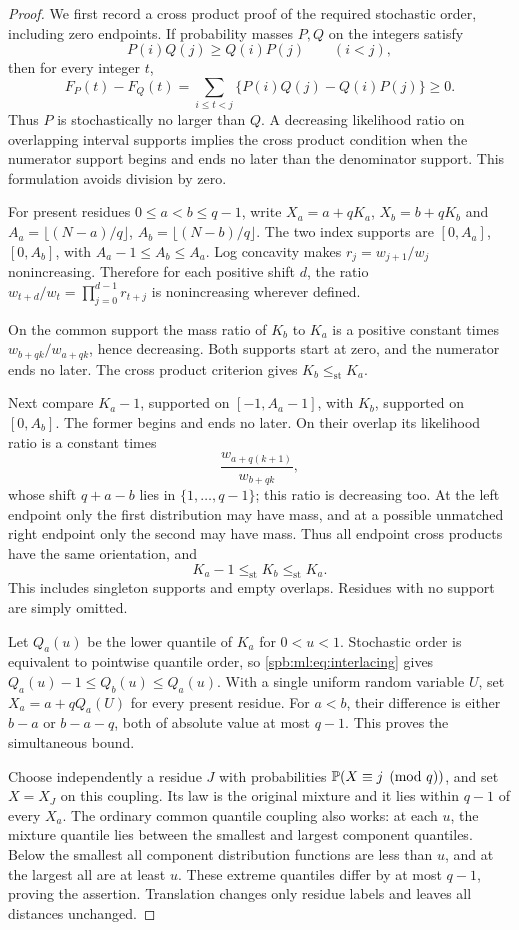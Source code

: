 \begin{proof}
We first record a cross product proof of the required stochastic order, including zero endpoints. If probability masses $P,Q$ on the integers satisfy
\[
 P(i)Q(j)\ge Q(i)P(j)\qquad(i<j),
\]
then for every integer $t$,
\[
 F_P(t)-F_Q(t)=\sum_{i\le t<j}\{P(i)Q(j)-Q(i)P(j)\}\ge0.
\]
Thus $P$ is stochastically no larger than $Q$. A decreasing likelihood ratio on overlapping interval supports implies the cross product condition when the numerator support begins and ends no later than the denominator support. This formulation avoids division by zero.

For present residues $0\le a<b\le q-1$, write $X_a=a+qK_a$, $X_b=b+qK_b$ and
$A_a=\lfloor(N-a)/q\rfloor$, $A_b=\lfloor(N-b)/q\rfloor$. The two index supports are $[0,A_a]$, $[0,A_b]$, with $A_a-1\le A_b\le A_a$. Log concavity makes $r_j=w_{j+1}/w_j$ nonincreasing. Therefore for each positive shift $d$, the ratio
$w_{t+d}/w_t=\prod_{j=0}^{d-1}r_{t+j}$ is nonincreasing wherever defined.

On the common support the mass ratio of $K_b$ to $K_a$ is a positive constant times $w_{b+qk}/w_{a+qk}$, hence decreasing. Both supports start at zero, and the numerator ends no later. The cross product criterion gives $K_b\le_{\mathrm{st}}K_a$.

Next compare $K_a-1$, supported on $[-1,A_a-1]$, with $K_b$, supported on $[0,A_b]$. The former begins and ends no later. On their overlap its likelihood ratio is a constant times
\[
 \frac{w_{a+q(k+1)}}{w_{b+qk}},
\]
whose shift $q+a-b$ lies in $\{1,\ldots,q-1\}$; this ratio is decreasing too. At the left endpoint only the first distribution may have mass, and at a possible unmatched right endpoint only the second may have mass. Thus all endpoint cross products have the same orientation, and
\begin{equation}\label{spb:ml:eq:interlacing}
 K_a-1\le_{\mathrm{st}}K_b\le_{\mathrm{st}}K_a.
\end{equation}
This includes singleton supports and empty overlaps. Residues with no support are simply omitted.

Let $Q_a(u)$ be the lower quantile of $K_a$ for $0<u<1$. Stochastic order is equivalent to pointwise quantile order, so \eqref{spb:ml:eq:interlacing} gives
$Q_a(u)-1\le Q_b(u)\le Q_a(u)$. With a single uniform random variable $U$, set $X_a=a+qQ_a(U)$ for every present residue. For $a<b$, their difference is either $b-a$ or $b-a-q$, both of absolute value at most $q-1$. This proves the simultaneous bound.

Choose independently a residue $J$ with probabilities $\mathbb P(X\equiv j\pmod q)$, and set $X=X_J$ on this coupling. Its law is the original mixture and it lies within $q-1$ of every $X_a$. The ordinary common quantile coupling also works: at each $u$, the mixture quantile lies between the smallest and largest component quantiles. Below the smallest all component distribution functions are less than $u$, and at the largest all are at least $u$. These extreme quantiles differ by at most $q-1$, proving the assertion. Translation changes only residue labels and leaves all distances unchanged.
\end{proof}

